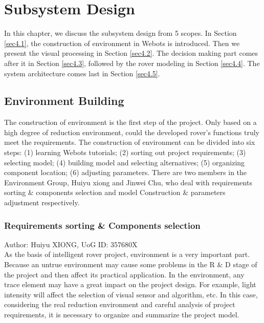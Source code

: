 \chapter{Subsystem Design\label{chap4}}
In this chapter, we discuss the subsystem design from 5 scopes. In Section \ref{sec4.1}, the construction of environment in Webots is introduced. Then we present the visual processing in Section \ref{sec4.2}. The decision making part comes after it in Section \ref{sec4.3}, followed by the rover modeling in Section \ref{sec4.4}. The system architecture comes last in Section \ref{sec4.5}.

\section{Environment Building\label{sec4.1}}
The construction of environment is the first step of the project. Only based on a high degree of reduction environment, could the developed rover’s functions  truly meet the requirements. The construction of environment can be divided into six steps: (1) learning Webots tutorials\cite{tutorial}; (2) sorting out project requirements; (3) selecting model; (4) building model and selecting alternatives; (5) organizing component location; (6) adjusting parameters. There are two members in the Environment Group, Huiyu xiong and Jinwei Chu, who deal with requirements sorting \& components selection and model Construction \& parameters adjustment respectively.


\subsection{Requirements sorting \& Components selection}
Author: Huiyu XIONG, UoG ID: 357680X\\

As the basis of intelligent rover project, environment is a very important part. Because an untrue environment may cause some problems in the R \& D stage of the project and then affect its practical application. In the environment, any trace element may have a great impact on the project design. For example, light intensity will affect the selection of visual sensor and algorithm, etc. In this case, considering the real reduction environment and careful analysis of project requirements, it is necessary to organize and summarize the project model.

